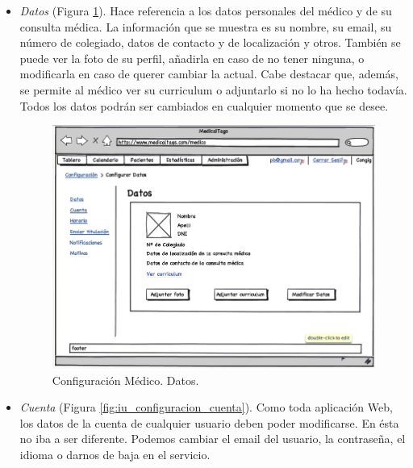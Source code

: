 		\begin{itemize}
			\item \textit{Datos} (Figura \ref{fig:iu_configuracion_datos}). Hace referencia a los datos personales del médico y de su consulta médica. La información que se muestra es su nombre, su email, su número de colegiado, datos de contacto y de localización y otros. También se puede ver la foto de su perfil, añadirla en caso de no tener ninguna, o modificarla en caso de querer cambiar la actual. Cabe destacar que, además, se permite al médico ver su curriculum o adjuntarlo si no lo ha hecho todavía. Todos los datos podrán ser cambiados en cualquier momento que se desee.
			
			
			\begin{figure}[H]
			  \centering
			    \includegraphics[width=12cm]{img/png/interfaz/23_Configuracion_Medico.png}
			  \caption{Configuración Médico. Datos.}
			  \label{fig:iu_configuracion_datos}
			\end{figure}
			
			\item \textit{Cuenta} (Figura \ref{fig:iu_configuracion_cuenta}). Como toda aplicación Web, los datos de la cuenta de cualquier usuario deben poder modificarse. En ésta no iba a ser diferente. Podemos cambiar el email del usuario, la contraseña, el idioma o darnos de baja en el servicio.
			

\end{itemize}
